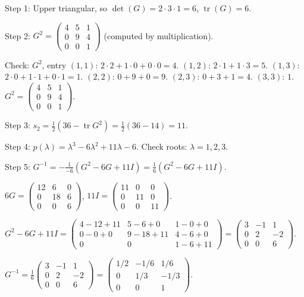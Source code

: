 \documentclass[12pt,a4paper]{article}
\begin{document}
Step 1: Upper triangular, so $\det(G)=2\cdot3\cdot1=6$, $\operatorname{tr}(G)=6$.

Step 2: $G^{2}=\begin{pmatrix}4&5&1\\0&9&4\\0&0&1\end{pmatrix}$ (computed by multiplication).

Check: $G^{2}$, entry $(1,1)$: $2\cdot2+1\cdot0+0\cdot0=4$. $(1,2)$: $2\cdot1+1\cdot3=5$. $(1,3)$: $2\cdot0+1\cdot1+0\cdot1=1$. $(2,2)$: $0+9+0=9$. $(2,3)$: $0+3+1=4$. $(3,3)$: $1$. $G^{2}=\begin{pmatrix}4&5&1\\0&9&4\\0&0&1\end{pmatrix}$.

Step 3: $s_{2}=\tfrac{1}{2}(36-\operatorname{tr}G^{2})=\tfrac{1}{2}(36-14)=11$.

Step 4: $p(\lambda)=\lambda^{3}-6\lambda^{2}+11\lambda-6$. Check roots: $\lambda=1,2,3$. \checkmark

Step 5: $G^{-1}=-\tfrac{1}{-6}(G^{2}-6G+11I)=\tfrac{1}{6}(G^{2}-6G+11I)$.

$6G=\begin{pmatrix}12&6&0\\0&18&6\\0&0&6\end{pmatrix}$, $11I=\begin{pmatrix}11&0&0\\0&11&0\\0&0&11\end{pmatrix}$.

$G^{2}-6G+11I=\begin{pmatrix}4-12+11&5-6+0&1-0+0\\0-0+0&9-18+11&4-6+0\\0&0&1-6+11\end{pmatrix}=\begin{pmatrix}3&-1&1\\0&2&-2\\0&0&6\end{pmatrix}$.

$G^{-1}=\tfrac{1}{6}\begin{pmatrix}3&-1&1\\0&2&-2\\0&0&6\end{pmatrix}=\begin{pmatrix}1/2&-1/6&1/6\\0&1/3&-1/3\\0&0&1\end{pmatrix}$.
\end{document}
